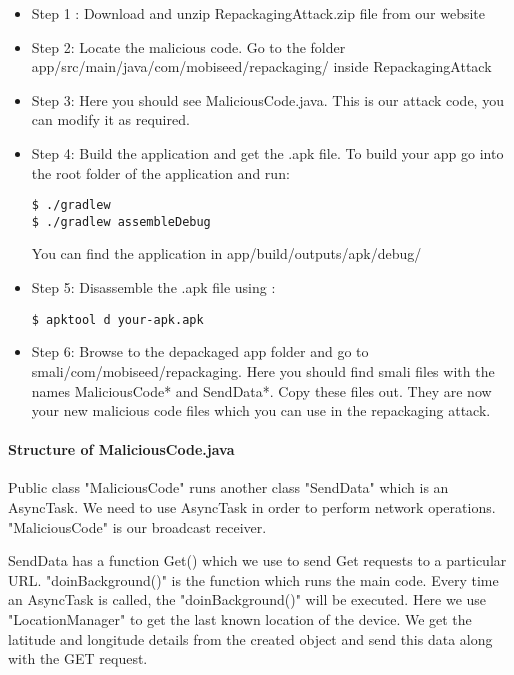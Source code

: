 \begin{itemize}
\item Step 1 : Download and unzip RepackagingAttack.zip file from our website

\item Step 2: Locate the malicious code. Go to the folder
app/src/main/java/com/mobiseed/repackaging/ inside RepackagingAttack

\item Step 3: Here you should see MaliciousCode.java. This is our attack code, you can modify
it as required.

\item Step 4: Build the application and get the .apk file. To build your app go into the root
folder of the application and run: 

\begin{lstlisting}
$ ./gradlew
$ ./gradlew assembleDebug
\end{lstlisting}

You can find the application in app/build/outputs/apk/debug/

\item Step 5: Disassemble the .apk file using : 
\begin{lstlisting}
$ apktool d your-apk.apk
\end{lstlisting}
\item Step 6: Browse to the depackaged app folder and go to smali/com/mobiseed/repackaging. Here you should find smali files with the names MaliciousCode* and SendData*. Copy these files out. They are now your new malicious code files which you can use in the repackaging attack.
\end{itemize}



\paragraph{Structure of MaliciousCode.java}
Public class "MaliciousCode" runs another class "SendData" which is an AsyncTask. We need to
use AsyncTask in order to perform network operations. "MaliciousCode" is our broadcast
receiver.


SendData has a function Get() which we use to send Get requests to a particular
URL. "doinBackground()" is the function which runs the main code. Every time an AsyncTask is
called, the "doinBackground()" will be executed. Here we use "LocationManager" to get the last
known location of the device. We get the latitude and longitude details from the created
object and send this data along with the GET request.



